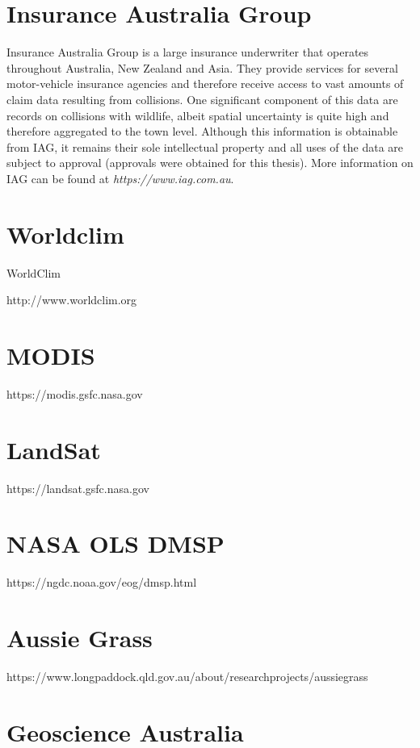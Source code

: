 \section{Insurance Australia Group}

Insurance Australia Group is a large insurance underwriter that operates throughout Australia, New Zealand and Asia. They provide services for several motor-vehicle insurance agencies and therefore receive access to vast amounts of claim data resulting from collisions. One significant component of this data are records on collisions with wildlife, albeit spatial uncertainty is quite high and therefore aggregated to the town level. Although this information is obtainable from IAG, it remains their sole intellectual property and all uses of the data are subject to approval (approvals were obtained for this thesis). More information on IAG can be found at \textit{https://www.iag.com.au}.

\section{Worldclim}

WorldClim

http://www.worldclim.org

\section{MODIS}

https://modis.gsfc.nasa.gov

\section{LandSat}

https://landsat.gsfc.nasa.gov

\section{NASA OLS DMSP}

https://ngdc.noaa.gov/eog/dmsp.html

\section{Aussie Grass}

https://www.longpaddock.qld.gov.au/about/researchprojects/aussiegrass

\section{Geoscience Australia}

